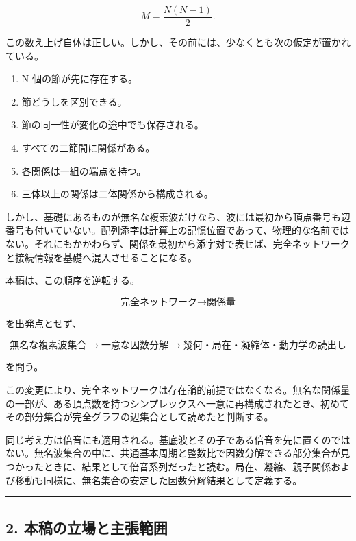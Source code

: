 \documentclass[
  a4paper,
]{ltjsarticle}
\providecommand{\tightlist}{%
  \setlength{\itemsep}{0pt}\setlength{\parskip}{0pt}}
\begin{document}
\[
M=\frac{N(N-1)}{2}.
\]

この数え上げ自体は正しい。しかし、その前には、少なくとも次の仮定が置かれている。

\begin{enumerate}
\def\labelenumi{\arabic{enumi}.}
\tightlist
\item
  N 個の節が先に存在する。
\item
  節どうしを区別できる。
\item
  節の同一性が変化の途中でも保存される。
\item
  すべての二節間に関係がある。
\item
  各関係は一組の端点を持つ。
\item
  三体以上の関係は二体関係から構成される。
\end{enumerate}

しかし、基礎にあるものが無名な複素波だけなら、波には最初から頂点番号も辺番号も付いていない。配列添字は計算上の記憶位置であって、物理的な名前ではない。それにもかかわらず、関係を最初から添字対で表せば、完全ネットワークと接続情報を基礎へ混入させることになる。

本稿は、この順序を逆転する。

\[
\text{完全ネットワーク}
\longrightarrow
\text{関係量}
\]

を出発点とせず、

\[
\text{無名な複素波集合}
\longrightarrow
\text{一意な因数分解}
\longrightarrow
\text{幾何・局在・凝縮体・動力学の読出し}
\]

を問う。

この変更により、完全ネットワークは存在論的前提ではなくなる。無名な関係量の一部が、ある頂点数を持つシンプレックスへ一意に再構成されたとき、初めてその部分集合が完全グラフの辺集合として読めたと判断する。

同じ考え方は倍音にも適用される。基底波とその子である倍音を先に置くのではない。無名波集合の中に、共通基本周期と整数比で因数分解できる部分集合が見つかったときに、結果として倍音系列だったと読む。局在、凝縮、親子関係および移動も同様に、無名集合の安定した因数分解結果として定義する。

\begin{center}\rule{0.5\linewidth}{0.5pt}\end{center}

\subsection{2.
本稿の立場と主張範囲}\label{ux672cux7a3fux306eux7acbux5834ux3068ux4e3bux5f35ux7bc4ux56f2}
\end{document}
